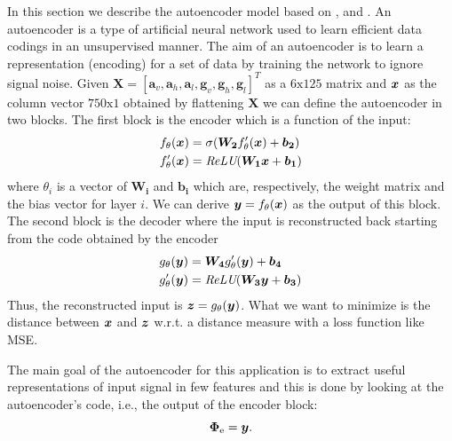 In this section we describe the autoencoder model based on
\cite{vincent2010stacked}, \cite{gu2018locomotion} and
\cite{gao2019human}. An autoencoder is a type of artificial neural
network used to learn efficient data codings in an unsupervised
manner. The aim of an autoencoder is to learn a representation
(encoding) for a set of data by training the network to ignore signal
noise. Given $\boldsymbol{X} = [ \boldsymbol{a}_v, \boldsymbol{a}_h,
  \boldsymbol{a}_l, \boldsymbol{g}_v, \boldsymbol{g}_h,
  \boldsymbol{g}_l ]^T$ as a $6\text{x}125$ matrix and $\boldsymbol{x}$ as the
column vector $750\text{x}1$ obtained by flattening $\boldsymbol{X}$ we
can define the autoencoder in two blocks. The first block is the
encoder which is a function of the input:
\begin{align}
  f_{\theta}(\boldsymbol{x}) &= \sigma(\boldsymbol{W_{2}} f'_\theta(\boldsymbol{x}) + \boldsymbol{b_{2}}) \\
  f'_{\theta}(\boldsymbol{x}) &= \textit{ReLU}(\boldsymbol{W_{1}}\boldsymbol{x} + \boldsymbol{b_{1}})
\end{align}
where $\theta_{i}$ is a vector of $\boldsymbol{W_{i}}$ and $\boldsymbol{b_{i}}$
which are, respectively, the weight matrix and the bias
vector for layer $i$. We
can derive $\boldsymbol{y} = f_\theta(\boldsymbol{x})$ as the output of this
block. The second block is the decoder where the input is
reconstructed back starting from the code obtained by the encoder
\begin{align}
  g_{\theta}(\boldsymbol{y}) &= \boldsymbol{W_{4}} g'_\theta(\boldsymbol{y}) + \boldsymbol{b_{4}} \\
  g'_{\theta}(\boldsymbol{y}) &= \textit{ReLU}(\boldsymbol{W_{3}}\boldsymbol{y} + \boldsymbol{b_{3}})
\end{align}
Thus, the reconstructed input
is $\boldsymbol{z} = g_{\theta}(\boldsymbol{y})$. What we want to minimize is the distance
between $\boldsymbol{x}$ and $\boldsymbol{z}$ w.r.t. a distance measure with a loss function
like MSE.

The main goal of the autoencoder for this application is to extract
useful representations of input signal in few features and this is
done by looking at the autoencoder's code, i.e., the output of the
encoder block:
\begin{equation}
  \boldsymbol{\Phi_{\text{e}}} = \boldsymbol{y}.
\end{equation}

